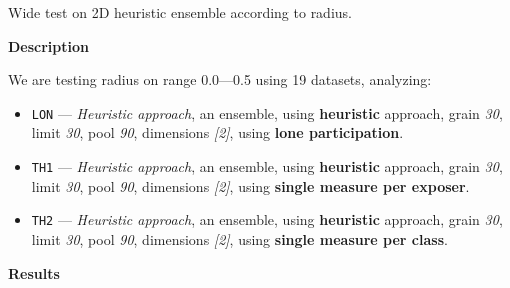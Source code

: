 \begin{experiment}{Wide test on 2D heuristic ensemble according to radius.}{\small \sffamily\textbf{Description}

We are testing radius on range 0.0---0.5 using 19 datasets, analyzing:

\begin{itemize}
\tightlist
	\item \texttt{LON} --- \emph{Heuristic approach}, an ensemble, using \textbf{heuristic} approach, grain \emph{30}, limit \emph{30}, pool \emph{90}, dimensions \emph{[2]}, using \textbf{lone participation}.
	\item \texttt{TH1} --- \emph{Heuristic approach}, an ensemble, using \textbf{heuristic} approach, grain \emph{30}, limit \emph{30}, pool \emph{90}, dimensions \emph{[2]}, using \textbf{single measure per exposer}.
	\item \texttt{TH2} --- \emph{Heuristic approach}, an ensemble, using \textbf{heuristic} approach, grain \emph{30}, limit \emph{30}, pool \emph{90}, dimensions \emph{[2]}, using \textbf{single measure per class}.

\end{itemize}


\textbf{Results}

}
\end{experiment}
